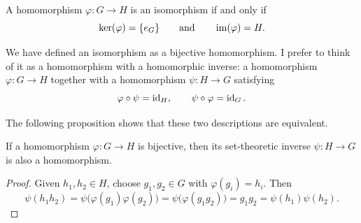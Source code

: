 \documentclass[reqno,11pt]{amsart}
\begin{document}
\begin{corollary}
	A homomorphism $\varphi:G\to H$ is an isomorphism if and only if
	\begin{equation}
		\ker(\varphi)=\{e_G\}
		\qquad\text{and}\qquad
		\operatorname{im}(\varphi)=H.
	\end{equation}
\end{corollary}

We have defined an isomorphism as a bijective homomorphism. I prefer to think
of it as a homomorphism with a homomorphic inverse: a homomorphism
$\varphi:G\to H$ together with a homomorphism
$\psi:H\to G$ satisfying
\begin{equation}
	\varphi\circ\psi=\operatorname{id}_H,
	\qquad
	\psi\circ\varphi=\operatorname{id}_G.
\end{equation}

The following proposition shows that these two descriptions are equivalent.

\begin{proposition}
	If a homomorphism $\varphi:G\to H$ is bijective, then its set-theoretic
	inverse $\psi:H\to G$ is also a homomorphism.
\end{proposition}

\begin{proof}
	Given $h_1,h_2\in H$, choose $g_1,g_2\in G$ with
	$\varphi(g_i)=h_i$. Then
	\[
	\psi(h_1h_2)=\psi\bigl(\varphi(g_1)\varphi(g_2)\bigr)
	=\psi\bigl(\varphi(g_1g_2)\bigr)=g_1g_2
	=\psi(h_1)\psi(h_2).
	\]
\end{proof}
\end{document}

